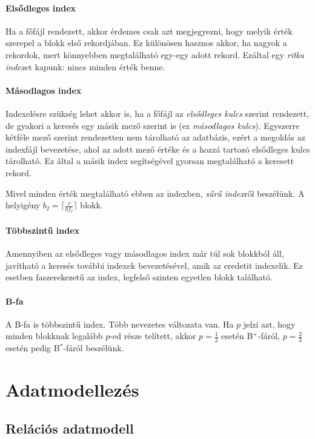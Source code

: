 \documentclass[fleqn,10pt,a4paper]{article}
\theoremstyle{magyar}
\begin{document}
  \paragraph{Elsődleges index} Ha a főfájl rendezett, akkor érdemes csak azt megjegyezni, hogy melyik érték szerepel a
  blokk első rekordjában. Ez különösen hasznos akkor, ha nagyok a rekordok, mert könnyebben megtalálható egy-egy adott
  rekord. Ezáltal egy \emph{ritka index}et kapunk: nincs minden érték benne.
  
  \paragraph{Másodlagos index} Indexelésre szükség lehet akkor is, ha a főfájl az \emph{elsődleges kulcs} szerint
  rendezett, de gyakori a keresés egy másik mező szerint is (ez \emph{másodlagos kulcs}). Egyszerre kétféle mező szerint
  rendezetten  nem tárolható az adatbázis, ezért a megoldás az indexfájl bevezetése, ahol az adott mező értéke és a
  hozzá tartozó elsődleges kulcs tárolható. Ez által a másik index segítségével gyorsan megtalálható a keresett rekord.
  
  Mivel minden érték megtalálható ebben az indexben, \emph{sűrű index}ről beszélünk. A helyigény $b_I = \lceil
  \frac{r}{bf_I} \rceil$ blokk.
  
  \paragraph{Többszintű index} Amennyiben az elsődleges vagy másodlagos index már túl sok blokkból áll, javítható a
  keresés további indexek bevezetésével, amik az eredetit indexelik. Ez esetben faszerekezetű az index, legfelső szinten
  egyetlen blokk található.

  \paragraph{B-fa} A B-fa is többszintű index. Több nevezetes változata van. Ha $p$ jelzi azt, hogy minden blokknak
  legalább $p$-ed része telített, akkor $p=\frac12$ esetén B$^+$-fáról, $p=\frac23$ esetén pedig B$^*$-fáról beszélünk.

  \newpage
  \section{Adatmodellezés}
  \subsection{Relációs adatmodell}
  
\end{document}
